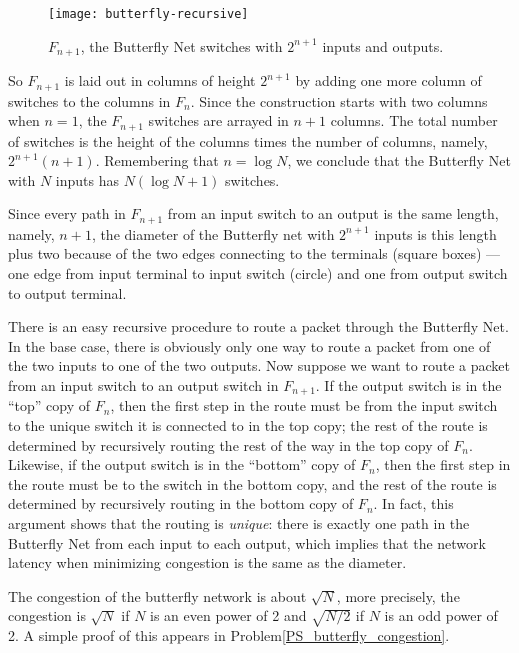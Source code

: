\begin{figure}
\texttt{[image: butterfly-recursive]}
\caption{$F_{n+1}$, the Butterfly Net switches with $2^{n+1}$ inputs
and outputs.}
\label{fig:butterfly-recursive}
\end{figure}

So $F_{n+1}$ is laid out in columns of height $2^{n+1}$ by adding one more
column of switches to the columns in $F_n$.  Since the construction starts
with two columns when $n=1$, the $F_{n+1}$ switches are arrayed in $n+1$
columns.  The total number of switches is the height of the columns times
the number of columns, namely, $2^{n+1}(n+1)$.  Remembering that $n=\log
N$, we conclude that the Butterfly Net with $N$ inputs has $N(\log N +1)$
switches.

Since every path in $F_{n+1}$ from an input switch to an output is the
same length, namely, $n+1$, the diameter of the Butterfly net with
$2^{n+1}$ inputs is this length plus two because of the two edges
connecting to the terminals (square boxes) ---one edge from input
terminal to input switch (circle) and one from output switch to output
terminal.

There is an easy recursive procedure to route a packet through the
Butterfly Net.  In the base case, there is obviously only one way to route
a packet from one of the two inputs to one of the two outputs.  Now
suppose we want to route a packet from an input switch to an output switch
in $F_{n+1}$.  If the output switch is in the ``top'' copy of $F_n$, then
the first step in the route must be from the input switch to the unique
switch it is connected to in the top copy; the rest of the route is
determined by recursively routing the rest of the way in the top copy of
$F_n$.  Likewise, if the output switch is in the ``bottom'' copy of $F_n$,
then the first step in the route must be to the switch in the bottom copy,
and the rest of the route is determined by recursively routing in the
bottom copy of $F_n$.  In fact, this argument shows that the routing is
\emph{unique}: there is exactly one path in the Butterfly Net from each
input to each output, which implies that the network latency when
minimizing congestion is the same as the diameter.

The congestion of the butterfly network is about $\sqrt{N}$, more
precisely, the congestion is $\sqrt{N}$ if $N$ is an even power of 2 and
$\sqrt{N/2}$ if $N$ is an odd power of 2.  A simple proof of this appears
in Problem\ref{PS_butterfly_congestion}.

